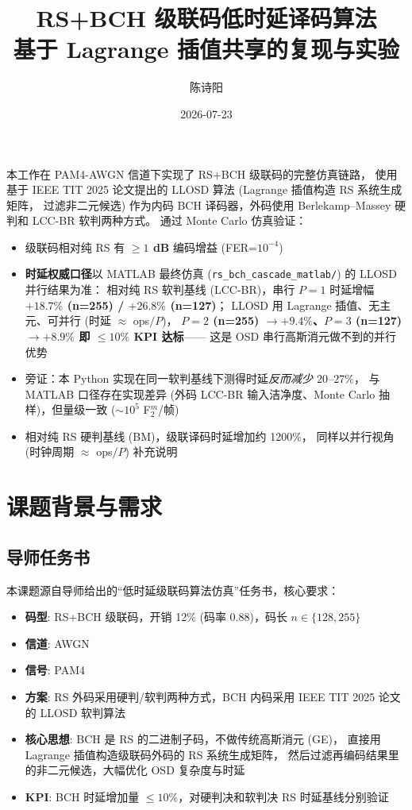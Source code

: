 \documentclass[11pt,a4paper]{article}
\title{RS+BCH 级联码低时延译码算法\\
       {\large 基于 Lagrange 插值共享的复现与实验}}
\author{陈诗阳}
\date{2026-07-23}
\begin{document}
\maketitle

\begin{keybox}[title=\textbf{摘要}]
本工作在 PAM4-AWGN 信道下实现了 RS+BCH 级联码的完整仿真链路，
使用基于 IEEE TIT 2025 论文提出的 LLOSD 算法 (Lagrange 插值构造 RS 系统生成矩阵，
过滤非二元候选) 作为内码 BCH 译码器，外码使用 Berlekamp--Massey 硬判和 LCC-BR 软判两种方式。
通过 Monte Carlo 仿真验证：
\begin{itemize}[leftmargin=1.5em, itemsep=1pt, topsep=2pt]
\item 级联码相对纯 RS 有 \textbf{$\geq 1$ dB} 编码增益 (FER=$10^{-4}$)
\item \textbf{时延权威口径}以 MATLAB 最终仿真 (\texttt{rs\_bch\_cascade\_matlab/}) 的 LLOSD 并行结果为准：
     相对纯 RS 软判基线 (LCC-BR)，串行 $P{=}1$ 时延增幅 \textbf{$+18.7\%$ (n=255) / $+26.8\%$ (n=127)}；
     LLOSD 用 Lagrange 插值、无主元、可并行 (时延 $\approx$ ops$/P$)，
     \textbf{$P{=}2$ (n=255) $\to +9.4\%$、$P{=}3$ (n=127) $\to +8.9\%$ 即 $\leq 10\%$ KPI 达标}——
     这是 OSD 串行高斯消元做不到的并行优势
\item 旁证：本 Python 实现在同一软判基线下测得时延\emph{反而减少 $20$--$27\%$}，
     与 MATLAB 口径存在实现差异 (外码 LCC-BR 输入洁净度、Monte Carlo 抽样)，但量级一致 ($\sim 10^5$ F$_2^m$/帧)
\item 相对纯 RS 硬判基线 (BM)，级联译码时延增加约 1200\%，
     同样以并行视角 (时钟周期 $\approx$ ops$/P$) 补充说明
\end{itemize}
\end{keybox}

\tableofcontents

\section{课题背景与需求}

\subsection{导师任务书}

本课题源自导师给出的``低时延级联码算法仿真''任务书，核心要求：

\begin{itemize}[leftmargin=1.5em]
\item \textbf{码型}: RS+BCH 级联码，开销 12\% (码率 0.88)，码长 $n \in \{128, 255\}$
\item \textbf{信道}: AWGN
\item \textbf{信号}: PAM4
\item \textbf{方案}: RS 外码采用硬判/软判两种方式，BCH 内码采用 IEEE TIT 2025 论文的 LLOSD 软判算法
\item \textbf{核心思想}: BCH 是 RS 的二进制子码，不做传统高斯消元 (GE)，
   直接用 Lagrange 插值构造级联码外码的 RS 系统生成矩阵，
   然后过滤再编码结果里的非二元候选，大幅优化 OSD 复杂度与时延
\item \textbf{KPI}: BCH 时延增加量 $\leq 10\%$，对硬判决和软判决 RS 时延基线分别验证
\end{itemize}
\end{document}

